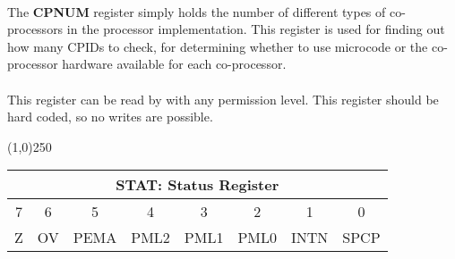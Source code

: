 \documentclass[letterpaper, 11pt]{article}
\begin{document}
\paragraph{} The \textbf{CPNUM} register simply holds the number of different types of
co-processors in the processor implementation. This register is used for finding out how many CPIDs to check, for determining whether to use microcode or the co-processor
hardware available for each co-processor.
\paragraph{} This register can be read by with any permission level. This register
should be hard coded, so no writes are possible.

\begin{center}
	\line(1,0){250}
\end{center}
\vspace{0.2 cm}




\clearpage

\begin{center}
	\begin{tabular}{|c|c|c|c|c|c|c|c|}
			\multicolumn{8}{c}{\textbf{STAT}: Status Register} \\ \hline
		 	7 & 6  &  5   &	4	 &	3	&	2  &	1 &	0 \\ \hline
			Z & OV & PEMA & PML2 & PML1 & PML0 & INTN & SPCP  \\ \hline
		
	\end{tabular}
\end{center}
\end{document}
